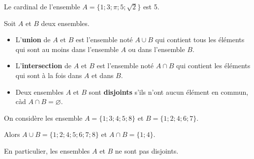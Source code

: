 \documentclass[11pt,fleqn, openany]{book} %
\begin{document}
\begin{example} Le cardinal de l'ensemble $A=\{1;3;\pi;5;\sqrt{2}\}$ est 5.\end{example}

\begin{definition} Soit $A$ et $B$ deux ensembles.
\begin{itemize}
\item L'\textbf{union} de $A$ et $B$ est l'ensemble noté $A\cup B$ qui contient tous les éléments qui sont au moins dans l'ensemble $A$ ou dans l'ensemble $B$.
\item L'\textbf{intersection} de $A$ et $B$ est l'ensemble noté $A\cap B$ qui contient les éléments qui sont à la fois dans $A$ et dans $B$.
\item Deux ensembles $A$ et $B$ sont \textbf{disjoints} s'ils n'ont aucun élément en commun, càd $A\cap B = \varnothing$.
\end{itemize}\end{definition}

\begin{example} On considère les ensemble $A=\{1;3;4;5;8\}$ et $B=\{1;2;4;6;7\}$. 

Alors $A\cup B = \{1;2;4;5;6;7;8\}$ et $A\cap B = \{ 1;4\}$. 

En particulier, les ensembles $A$ et $B$ ne sont pas disjoints.\end{example}
\end{document}
